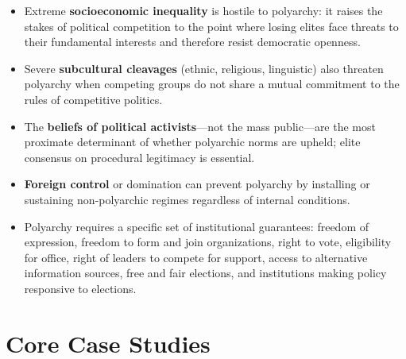 \documentclass[12pt]{article}
\begin{document}
\begin{itemize}[leftmargin=*, itemsep=4pt]
    \item Extreme \textbf{socioeconomic inequality} is hostile to polyarchy: it raises the stakes of political competition to the point where losing elites face threats to their fundamental interests and therefore resist democratic openness.
    \item Severe \textbf{subcultural cleavages} (ethnic, religious, linguistic) also threaten polyarchy when competing groups do not share a mutual commitment to the rules of competitive politics.
    \item The \textbf{beliefs of political activists}---not the mass public---are the most proximate determinant of whether polyarchic norms are upheld; elite consensus on procedural legitimacy is essential.
    \item \textbf{Foreign control} or domination can prevent polyarchy by installing or sustaining non-polyarchic regimes regardless of internal conditions.
    \item Polyarchy requires a specific set of institutional guarantees: freedom of expression, freedom to form and join organizations, right to vote, eligibility for office, right of leaders to compete for support, access to alternative information sources, free and fair elections, and institutions making policy responsive to elections.
\end{itemize}

\section{Core Case Studies}
\end{document}
